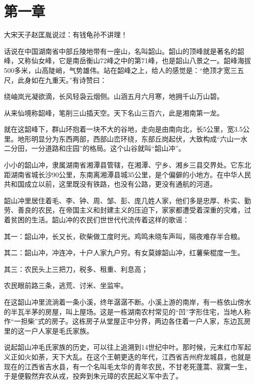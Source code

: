 \documentclass[../../dazhuan.tex]{subfiles}
\begin{document}
\chapter*{第一章}

\begin{pref}
大宋天子赵匡胤说过：有钱龟孙不讲理！
\end{pref}

话说在中国湖南省中部丘陵地带有一座山，名叫韶山。韶山的顶峰就是著名的韶峰，又称仙女峰，它是南岳衡山72峰之中的第71峰，也是韶山八景之一。韶峰海拔500多米，山高陡峭，气势雄伟。站在韶峰之上，给人的感觉是：“绝顶才宽三五尺，此身如在九重天。”有诗赞曰：

绕岫岚光凝欲滴，长风轻袅云烟侧。山涵五月六月寒，地拥千山万山碧。

从来仙境称韶峰，笔削三山插天空。天下名山三百六，此是湘南第一龙。

就在这韶峰下，群山环抱着一块不大的谷地，走向是由南向北，长5公里，宽3.5公里。地形明显分为东西两部，西部山峦环绕，东部丘岗起伏，大致构成“六山一水二分田，一分道路和庄园”的格局。这个山谷就叫“韶山冲”。

小小的韶山冲，隶属湖南省湘潭县管辖，在湘潭、宁乡、湘乡三县交界处。它东北距湖南省城长沙90公里，东南离湘潭县城35公里，是个偏僻的小地方。在中华人民共和国成立以前，这里既没有铁路，也没有公路，更没有通航的河道。

韶山冲里居住着毛、李、钟、周、邹、彭、庞几姓人家，他们多是忠厚、朴实、勤劳、善良的农民，在帝国主义和封建主义的压迫下，家家都遭受着深重的灾难，过着贫困的生活。韶山冲的农民们世世代代流传着这样的歌谣：

其一：韶山冲，长又长，砍柴做工度时光。鸡鸣未晓车声叫，隔夜难存半合粮。

其二：韶山冲，冲连冲，十户人家九户穷。有女莫嫁韶山冲，红薯柴棍度一生。

其三：农民头上三把刀，税多、租重、利息高；

农民眼前路三条，逃荒、讨米、坐监牢。

在这韶山冲里流淌着一条小溪，终年潺潺不断。小溪上游的南岸，有一栋依山傍水的半瓦半茅的房屋，叫上屋场。这是一栋湖南农村常见的“凹”字形住宅，当地人称作“一担柴”式的房子。这栋房子从堂屋正中分界，两边各住着一户人家，东边瓦房里的这一户人家是毛氏家族。

说起韶山冲毛氏家族的历史，可以往上追溯到14世纪中叶。那时候，元末红巾军起义正如火如荼，天下大乱。在这个王朝更迭的年代，江西省吉州府龙城县，也就是现在的江西省吉水县，有一个名叫毛太华的青年农民，不甘老死蓬蒿、寂寞一生，于是便毅然弃农从戎，投奔到朱元璋的农民起义军中去了。
\end{document}
